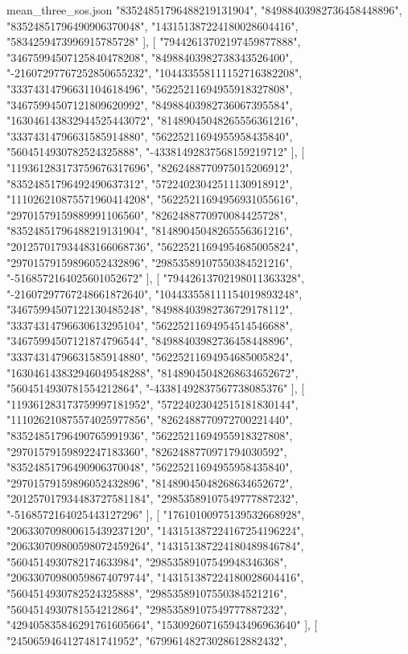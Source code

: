 \begin{filecontents*}[overwrite]{mean_three_sos.json}
    "83524851796488219131904",
    "84988403982736458448896",
    "83524851796490906370048",
    "143151387224180028604416",
    "5834259473996915785728"
   ],
   [
    "79442613702197459877888",
    "34675994507125840478208",
    "84988403982738343526400",
    "-21607297767252850655232",
    "104433558111152716382208",
    "33374314796631104618496",
    "56225211694955918327808",
    "34675994507121809620992",
    "84988403982736067395584",
    "163046143832944525443072",
    "81489045048265556361216",
    "33374314796631585914880",
    "56225211694955958435840",
    "5604514930782524325888",
    "-43381492837568159219712"
   ],
   [
    "119361283173759676317696",
    "8262488770975015206912",
    "83524851796492490637312",
    "57224023042511130918912",
    "111026210875571960414208",
    "56225211694956931055616",
    "29701579159889991106560",
    "8262488770970084425728",
    "83524851796488219131904",
    "81489045048265556361216",
    "201257017934483166068736",
    "56225211694954685005824",
    "29701579159896052432896",
    "29853589107550384521216",
    "-5168572164025601052672"
   ],
   [
    "79442613702198011363328",
    "-21607297767248661872640",
    "104433558111154019893248",
    "34675994507122130485248",
    "84988403982736729178112",
    "33374314796630613295104",
    "56225211694954514546688",
    "34675994507121874796544",
    "84988403982736458448896",
    "33374314796631585914880",
    "56225211694954685005824",
    "163046143832946049548288",
    "81489045048268634652672",
    "5604514930781554212864",
    "-43381492837567738085376"
   ],
   [
    "119361283173759997181952",
    "57224023042515181830144",
    "111026210875574025977856",
    "8262488770972700221440",
    "83524851796490765991936",
    "56225211694955918327808",
    "29701579159892247183360",
    "8262488770971794030592",
    "83524851796490906370048",
    "56225211694955958435840",
    "29701579159896052432896",
    "81489045048268634652672",
    "201257017934483727581184",
    "29853589107549777887232",
    "-5168572164025443127296"
   ],
   [
    "17610100975139532668928",
    "206330709800615439237120",
    "143151387224167254196224",
    "206330709800598072459264",
    "143151387224180489846784",
    "5604514930782174633984",
    "29853589107549948346368",
    "206330709800598674079744",
    "143151387224180028604416",
    "5604514930782524325888",
    "29853589107550384521216",
    "5604514930781554212864",
    "29853589107549777887232",
    "429405835846291761605664",
    "153092607165943496963640"
   ],
   [
    "2450659464127481741952",
    "67996148273028612882432",

\end{filecontents*}
